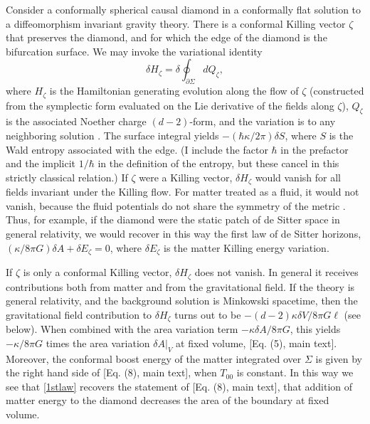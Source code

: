 \documentclass[aps,prd,showpacs,groupedaddress,nofootinbib,longbibliography,12pt]{revtex4-1}
\def\beq{\begin{equation}}
\def\eeq{\end{equation}}
\def\d{\delta}\def\D{\Delta}
\def\z{\zeta}
\def\k{\kappa}
\begin{document}
Consider a conformally spherical causal diamond in a conformally flat solution to 
a diffeomorphism invariant gravity theory. 
There is a conformal Killing vector $\z$ that preserves the diamond, and for which the edge of the diamond is the bifurcation surface. We may invoke the variational identity 
%
\beq\label{1stlaw}
\d H_\z = \d \oint_{\partial\Sigma} dQ_\z,
\eeq
%
where $H_\z$ is the Hamiltonian generating evolution along the flow of $\z$ (constructed from the symplectic form evaluated on the Lie derivative of the fields along $\z$), $Q_\z$ is the associated
Noether charge $(d-2)$-form, and the variation is to any neighboring solution \cite{Iyer:1994ys}. 
The surface integral yields $-(\hbar\k/2\pi) \d S$, where $S$ is the Wald entropy associated with 
 the edge. 
(I include the factor $\hbar$ in the prefactor and the implicit $1/\hbar$ in the definition of the entropy, 
but these cancel in this strictly classical relation.)
If $\z$ were a Killing vector, $\d H_\z$ would vanish for all fields invariant under the Killing flow.
For matter treated as a fluid, it would not vanish, because the fluid potentials do not share the symmetry of the metric \cite{Iyer:1996ky,Green:2013ica}. Thus, for example, if the diamond were the static patch of de Sitter space in general relativity, we would recover in this way the first law of de Sitter horizons,
$(\k/8\pi G)\d A + \d E_\z=0$, where $\d E_\z$ is the matter Killing energy variation.

If $\z$ is only a conformal Killing vector,  $\d H_\z$ does not vanish. 
In general it receives contributions both from matter and from the gravitational field. 
If the theory is general relativity, and 
the background solution is Minkowski spacetime, then the gravitational field contribution to $\d H_\z$  
turns out to be $-(d-2)\k\d V/8\pi G\ell$ (see below).
When combined with the area variation term $-\k\d A/8\pi G$, this yields $-\k/8\pi G$ times 
the area variation $\d A|_V$ at fixed volume, [Eq. (5), main text].
Moreover, the conformal boost energy of the matter integrated over $\Sigma$ is given by the right hand side of %
[Eq. (8), main text],
when $T_{00}$ is constant. In this way we see that \eqref{1stlaw} recovers the statement of 
[Eq. (8), main text],
that addition of matter energy to the diamond decreases the area of the boundary at fixed volume.
\end{document}
